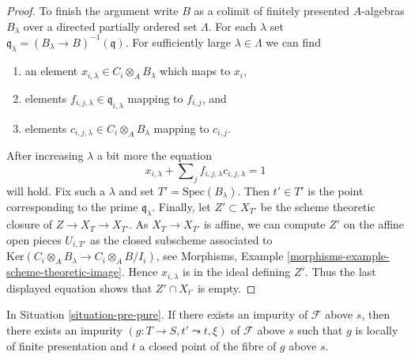 \begin{proof}
\medskip\noindent
To finish the argument write $B$ as a colimit of finitely presented
$A$-algebras $B_\lambda$ over a directed partially ordered set $\Lambda$.
For each $\lambda$ set
$\mathfrak q_\lambda = (B_\lambda \to B)^{-1}(\mathfrak q)$.
For sufficiently large $\lambda \in \Lambda$ we can find
\begin{enumerate}
\item an element
$x_{i, \lambda} \in C_i \otimes_A B_\lambda$ which maps to $x_i$,
\item elements $f_{i, j, \lambda} \in \mathfrak q_{i, \lambda}$
mapping to $f_{i, j}$, and
\item elements $c_{i, j, \lambda} \in C_i \otimes_A B_\lambda$
mapping to $c_{i, j}$.
\end{enumerate}
After increasing $\lambda$ a bit more the equation
$$
x_{i, \lambda} + \sum\nolimits_j f_{i, j, \lambda}c_{i, j, \lambda} = 1
$$
will hold. Fix such a $\lambda$ and set $T' = \text{Spec}(B_\lambda)$.
Then $t' \in T'$ is the point corresponding to the prime $\mathfrak q_\lambda$.
Finally, let $Z' \subset X_{T'}$ be the scheme theoretic closure of
$Z \to X_T \to X_{T'}$. As $X_T \to X_{T'}$ is affine, we can compute $Z'$
on the affine open pieces $U_{i, T'}$ as the closed subscheme associated
to $\text{Ker}(C_i \otimes_A B_\lambda \to C_i \otimes_A B/I_i)$, see
Morphisms, Example \ref{morphisms-example-scheme-theoretic-image}.
Hence $x_{i, \lambda}$ is in the ideal defining $Z'$. Thus the last
displayed equation shows that $Z' \cap X_{t'}$ is empty.
\end{proof}

\begin{lemma}
\label{lemma-impure-finite-presentation}
In Situation \ref{situation-pre-pure}.
If there exists an impurity of $\mathcal{F}$ above $s$, then
there exists an impurity $(g : T \to S, t' \leadsto t, \xi)$
of $\mathcal{F}$ above $s$ such that $g$ is locally of finite
presentation and $t$ a closed point of the fibre of $g$ above $s$.
\end{lemma}


